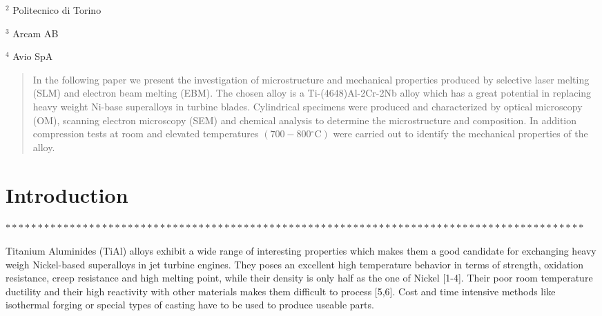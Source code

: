 \documentclass[10pt]{article}
\begin{document}
${ }^{2}$ Politecnico di Torino

${ }^{3}$ Arcam AB

${ }^{4}$ Avio SpA

\begin{abstract}
In the following paper we present the investigation of microstructure and mechanical properties produced by selective laser melting (SLM) and electron beam melting (EBM). The chosen alloy is a Ti-(4648)Al-2Cr-2Nb alloy which has a great potential in replacing heavy weight Ni-base superalloys in turbine blades. Cylindrical specimens were produced and characterized by optical microscopy (OM), scanning electron microscopy (SEM) and chemical analysis to determine the microstructure and composition. In addition compression tests at room and elevated temperatures $\left(700-800{ }^{\circ} \mathrm{C}\right)$ were carried out to identify the mechanical properties of the alloy.
\end{abstract}

\section*{Introduction}
$* * * * * * * * * * * * * * * * * * * * * * * * * * * * * * * * * * * * * * * * * * * * * * * * * * * * * * * * * * * * * * * * * * * * * * * * * * * * * * * * * * * * * * * * * *$

Titanium Aluminides (TiAl) alloys exhibit a wide range of interesting properties which makes them a good candidate for exchanging heavy weigh Nickel-based superalloys in jet turbine engines. They poses an excellent high temperature behavior in terms of strength, oxidation resistance, creep resistance and high melting point, while their density is only half as the one of Nickel [1-4]. Their poor room temperature ductility and their high reactivity with other materials makes them difficult to process [5,6]. Cost and time intensive methods like isothermal forging or special types of casting have to be used to produce useable parts.
\end{document}
